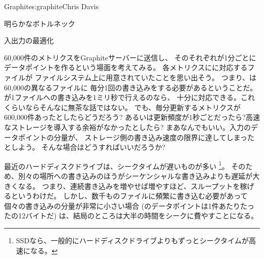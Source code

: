 \begin{aosachapter}{Graphite}{s:graphite}{Chris Davis}
\begin{aosasect1}{明らかなボトルネック}
\end{aosasect1}

\begin{aosasect1}{入出力の最適化}

60,000件のメトリクスをGraphiteサーバーに送信し、
そのそれぞれが1分ごとにデータポイントを作るという場面を考えてみる。
各メトリクスにに対応するファイルが
ファイルシステム上に用意されていたことを思い出そう。
つまり、は60,000の異なるファイルに
毎分1回の書き込みをする必要があるということだ。
が1ファイルへの書き込みを1ミリ秒で行えるのなら、
十分に対応できる。これくらいならそんなに無茶な話ではない。
でも、毎分更新するメトリクスが600,000件あったとしたらどうだろう?
あるいは更新頻度が1秒ごとだったら?高速なストレージを導入する余裕がなかったとしたら?
まあなんでもいい。入力のデータポイントの分量が、
ストレージ側の書き込み速度の限界に達してしまったとしよう。
そんな場合はどうすればいいだろうか?

最近のハードディスクドライブは、シークタイムが遅いものが多い
\footnote{SSDなら、一般的にハードディスクドライブよりもずっとシークタイムが高速になる。}。
そのため、別々の場所への書き込みのほうがシーケンシャルな書き込みよりも遅延が大きくなる。
つまり、連続書き込みを増やせば増やすほど、スループットを稼げるというわけだ。
しかし、数千ものファイルに頻繁に書き込む必要があって
個々の書き込みの分量が非常に小さい場合
(のデータポイントは1件あたりたったの12バイトだ)
は、結局のところは大半の時間をシークに費やすことになる。


\end{aosasect1}
\end{aosachapter}
